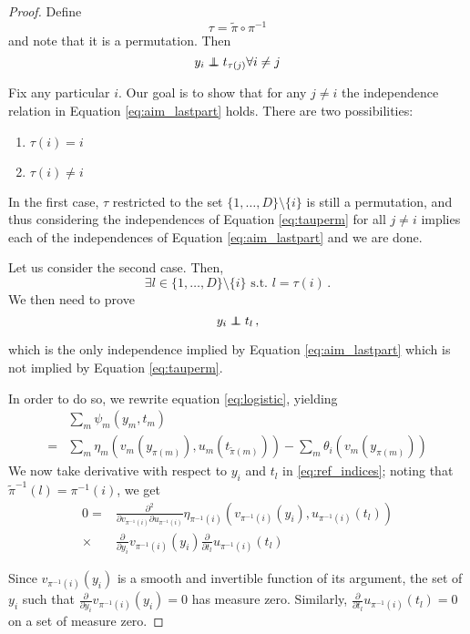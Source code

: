 \begin{proof}
	Define
	\[
	\tau = \tilde{\pi} \circ \pi^{-1}
	\]
	and note that it is a permutation. Then
	\begin{equation}
	y_i \independent t_{\tau(j)}  \forall i \neq j \label{eq:tauperm}
	\end{equation}
	
	Fix any particular $i$.
	Our goal is to show that for any $j\not= i$ the independence relation in Equation \ref{eq:aim_lastpart} holds.
	There are two possibilities:
	\begin{enumerate}
		\item $\tau(i)=i$
		\item $\tau(i)\neq i$
	\end{enumerate}
	In the first case, $\tau$ restricted to the set $\{1,\ldots,D\}\setminus\{i\}$ is still a permutation, and thus considering the independences of Equation \ref{eq:tauperm} for all $j\not= i$ implies each of the independences of Equation \ref{eq:aim_lastpart} and we are done.
	
	Let us consider the second case. Then,
	\[
	\exists l \in \{1, \ldots, D \}\setminus\{i\}\,\, \text{s.t.} \,\, l = \tau(i)\,.
	\]
	We then need to prove
	\begin{equation}
	y_i \independent t_l\,, \label{eq:ref_indices}
	\end{equation}
	
	which is the only independence implied by Equation \ref{eq:aim_lastpart} which is not implied by Equation \ref{eq:tauperm}.
	
	In order to do so, we rewrite equation \ref{eq:logistic}, yielding
	\begin{align}
	&\sum_{m}\psi_{m}(y_{m},t_{m}) \nonumber \\
	=&\sum_{m}\eta_{m}(v_m(y_{\pi(m)}), u_m(t_{\tilde{\pi}(m)}))
	-\sum_{m}\theta_{i}(v_m(y_{\pi(m)}))
	\end{align}
	We now take derivative with respect to $y_i$ and $t_l$ in \ref{eq:ref_indices}; noting that $\tilde{\pi}^{-1}(l) = \pi^{-1}(i) $, we get
	\begin{align}
	0 = & \frac{\partial^2}{\partial v_{\pi^{-1}(i)} \partial u_{\pi^{-1}(i)}} \eta_{\pi^{-1}(i)}(v_{\pi^{-1}(i)}(y_i), u_{\pi^{-1}(i)}(t_l)) \nonumber \\
	\times & \frac{\partial}{\partial y_i}v_{\pi^{-1}(i)}(y_i) \frac{\partial }{\partial t_l} u_{\pi^{-1}(i)}(t_l) \label{eq:perm_deriv}
	\end{align}
	
	Since $v_{\pi^{-1}(i)}(y_i)$ is a smooth and invertible function of its argument, the set of $y_i$ such that $\frac{\partial}{\partial y_i}v_{\pi^{-1}(i)}(y_i) = 0$ has measure zero.
	Similarly, $\frac{\partial }{\partial t_l} u_{\pi^{-1}(i)}(t_l) = 0$ on a set of measure zero.
	

\end{proof}
